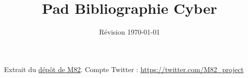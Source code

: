 \documentclass[12pt,a4paper]{article}
\author{Révision \today}
\title{Pad Bibliographie Cyber}
\date{}
\begin{document}
\maketitle
Extrait du \href{https://github.com/M82-project/Bibliography}{dépôt de M82}. Compte Twitter : \url{https://twitter.com/M82_project}\nocite{*}
\renewcommand{\thepage}{}


\end{document}
